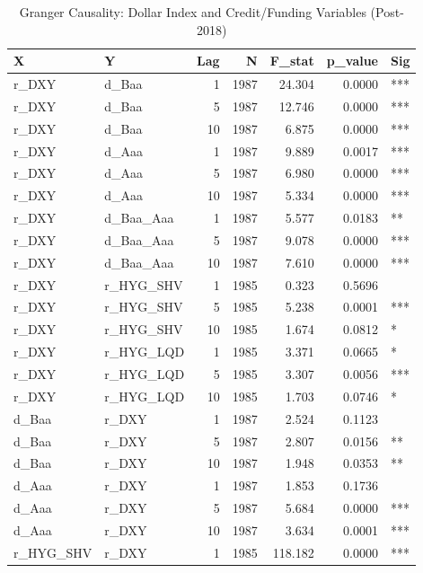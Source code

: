 \begin{table}[htbp]
\centering
\caption{Granger Causality: Dollar Index and Credit/Funding Variables (Post-2018)} 
\label{tab:granger_dxy}
\begin{tabular}{llrrrrl}
  \toprule
X & Y & Lag & N & F\_stat & p\_value & Sig \\ 
  \midrule
r\_DXY & d\_Baa & 1 & 1987 & 24.304 & 0.0000 & *** \\ 
  r\_DXY & d\_Baa & 5 & 1987 & 12.746 & 0.0000 & *** \\ 
  r\_DXY & d\_Baa & 10 & 1987 & 6.875 & 0.0000 & *** \\ 
  r\_DXY & d\_Aaa & 1 & 1987 & 9.889 & 0.0017 & *** \\ 
  r\_DXY & d\_Aaa & 5 & 1987 & 6.980 & 0.0000 & *** \\ 
  r\_DXY & d\_Aaa & 10 & 1987 & 5.334 & 0.0000 & *** \\ 
  r\_DXY & d\_Baa\_Aaa & 1 & 1987 & 5.577 & 0.0183 &  ** \\ 
  r\_DXY & d\_Baa\_Aaa & 5 & 1987 & 9.078 & 0.0000 & *** \\ 
  r\_DXY & d\_Baa\_Aaa & 10 & 1987 & 7.610 & 0.0000 & *** \\ 
  r\_DXY & r\_HYG\_SHV & 1 & 1985 & 0.323 & 0.5696 &     \\ 
  r\_DXY & r\_HYG\_SHV & 5 & 1985 & 5.238 & 0.0001 & *** \\ 
  r\_DXY & r\_HYG\_SHV & 10 & 1985 & 1.674 & 0.0812 &   * \\ 
  r\_DXY & r\_HYG\_LQD & 1 & 1985 & 3.371 & 0.0665 &   * \\ 
  r\_DXY & r\_HYG\_LQD & 5 & 1985 & 3.307 & 0.0056 & *** \\ 
  r\_DXY & r\_HYG\_LQD & 10 & 1985 & 1.703 & 0.0746 &   * \\ 
  d\_Baa & r\_DXY & 1 & 1987 & 2.524 & 0.1123 &     \\ 
  d\_Baa & r\_DXY & 5 & 1987 & 2.807 & 0.0156 &  ** \\ 
  d\_Baa & r\_DXY & 10 & 1987 & 1.948 & 0.0353 &  ** \\ 
  d\_Aaa & r\_DXY & 1 & 1987 & 1.853 & 0.1736 &     \\ 
  d\_Aaa & r\_DXY & 5 & 1987 & 5.684 & 0.0000 & *** \\ 
  d\_Aaa & r\_DXY & 10 & 1987 & 3.634 & 0.0001 & *** \\ 
  r\_HYG\_SHV & r\_DXY & 1 & 1985 & 118.182 & 0.0000 & *** \\ 

\end{tabular}
\end{table}
